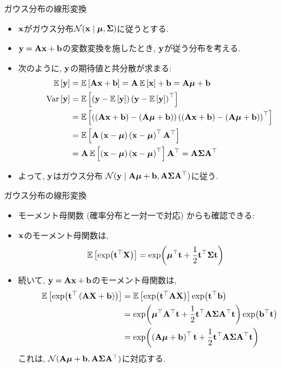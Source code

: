 \documentclass[dvipdfmx,notheorems,t]{beamer}
\begin{document}
\begin{frame}{ガウス分布の線形変換}
\begin{itemize}
  \item $\vb{x}$がガウス分布$\mathcal{N}(\vb{x} \mid \vb*{\mu}, \vb{\Sigma})$に従うとする.
  \item $\vb{y} = \vb{A} \vb{x} + \vb{b}$の変数変換を施したとき, $\vb{y}$が従う分布を考える.
  \item 次のように, $\vb{y}$の期待値と共分散が求まる:
  \begin{align*}
    \operatorname{\mathbb{E}} \left[ \vb{y} \right] &= \operatorname{\mathbb{E}} \left[ \vb{A} \vb{x} + \vb{b} \right] = \vb{A} \operatorname{\mathbb{E}} \left[ \vb{x} \right] + \vb{b}
      = \vb{A} \vb*{\mu} + \vb{b} \\
    \operatorname{Var} \left[ \vb{y} \right] &= \operatorname{\mathbb{E}} \left[ \left( \vb{y} - \operatorname{\mathbb{E}} \left[ \vb{y} \right] \right) \left( \vb{y} - \operatorname{\mathbb{E}} \left[ \vb{y} \right] \right)^\top \right] \\
    &= \operatorname{\mathbb{E}} \left[ \left( \left( \vb{A} \vb{x} + \vb{b} \right) - \left( \vb{A} \vb*{\mu} + \vb{b} \right) \right)
      \left( \left( \vb{A} \vb{x} + \vb{b} \right) - \left( \vb{A} \vb*{\mu} + \vb{b} \right) \right)^\top \right] \\
    &= \operatorname{\mathbb{E}} \left[ \vb{A} \left( \vb{x} - \vb*{\mu} \right) \left( \vb{x} - \vb*{\mu} \right)^\top \vb{A}^\top \right] \\
    &= \vb{A} \operatorname{\mathbb{E}} \left[ \left( \vb{x} - \vb*{\mu} \right) \left( \vb{x} - \vb*{\mu} \right)^\top \right] \vb{A}^\top
    = \vb{A} \vb{\Sigma} \vb{A}^\top
  \end{align*}
  \item よって, $\vb{y}$はガウス分布
  $\mathcal{N}(\vb{y} \mid \vb{A} \vb*{\mu} + \vb{b}, \vb{A} \vb{\Sigma} \vb{A}^\top)$に従う.
\end{itemize}
\end{frame}

\begin{frame}{ガウス分布の線形変換}
\begin{itemize}
  \item モーメント母関数 (確率分布と一対一で対応) からも確認できる:
  \item $\vb{x}$のモーメント母関数は,
  \begin{align*}
    \operatorname{\mathbb{E}} \left[ \exp(\vb{t}^\top \vb{X}) \right]
    &= \exp(\vb*{\mu}^\top \vb{t} + \frac{1}{2} \vb{t}^\top \vb{\Sigma} \vb{t})
  \end{align*}
  \item 続いて, $\vb{y} = \vb{A} \vb{x} + \vb{b}$のモーメント母関数は,
  \begin{align*}
    \operatorname{\mathbb{E}} \left[ \exp(\vb{t}^\top \left( \vb{A} \vb{X} + \vb{b} \right)) \right]
    &= \operatorname{\mathbb{E}} \left[ \exp(\vb{t}^\top \vb{A} \vb{X}) \right] \exp(\vb{t}^\top \vb{b}) \\
    &= \exp(\vb*{\mu}^\top \vb{A}^\top \vb{t}
      + \frac{1}{2} \vb{t}^\top \vb{A} \vb{\Sigma} \vb{A}^\top \vb{t})
      \exp(\vb{b}^\top \vb{t}) \\
    &= \exp(\left( \vb{A} \vb*{\mu} + \vb{b} \right)^\top \vb{t}
      + \frac{1}{2} \vb{t}^\top \vb{A} \vb{\Sigma} \vb{A}^\top \vb{t})
  \end{align*}
  これは, $\mathcal{N}(\vb{A} \vb*{\mu} + \vb{b}, \vb{A} \vb{\Sigma} \vb{A}^\top)$に対応する.
\end{itemize}
\end{frame}
\end{document}
